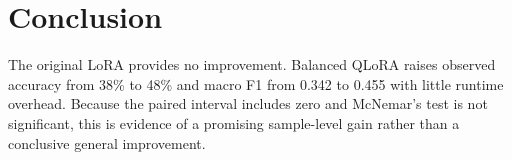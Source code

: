 \documentclass[11pt,a4paper]{report}
\begin{document}
\section{Conclusion}

The original LoRA provides no improvement. Balanced QLoRA raises observed
accuracy from 38\% to 48\% and macro F1 from 0.342 to 0.455 with little runtime
overhead. Because the paired interval includes zero and McNemar's test is not
significant, this is evidence of a promising sample-level gain rather than a
conclusive general improvement.
\end{document}

